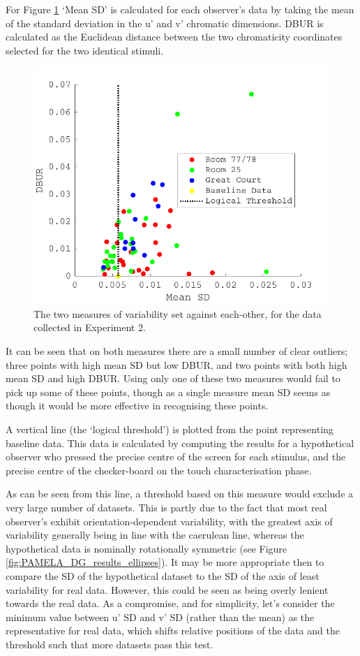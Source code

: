 For Figure \ref{fig:excl1} `Mean SD' is calculated for each observer's data by taking the mean of the standard deviation in the u' and v' chromatic dimensions. \gls{DBUR} is calculated as the Euclidean distance between the two chromaticity coordinates selected for the two identical stimuli.

\begin{figure}[hbtp] 
\includegraphics[max width=\textwidth]{figs/tablet/excl1.pdf} 
\caption{The two measures of variability set against each-other, for the data collected in Experiment 2.}
\label{fig:excl1}
\end{figure}

It can be seen that on both measures there are a small number of clear outliers; three points with high mean SD but low \gls{DBUR}, and two points with both high mean SD and high \gls{DBUR}. Using only one of these two measures would fail to pick up some of these points, though as a single measure mean SD seems as though it would be more effective in recognising these points.

A vertical line (the `logical threshold') is plotted from the point representing baseline data. This data is calculated by computing the results for a hypothetical observer who pressed the precise centre of the screen for each stimulus, and the precise centre of the checker-board on the touch characterisation phase. 

As can be seen from this line, a threshold based on this measure would exclude a very large number of datasets. This is partly due to the fact that most real observer's exhibit orientation-dependent variability, with the greatest axis of variability generally being in line with the caerulean line, whereas the hypothetical data is nominally rotationally symmetric (see Figure \ref{fig:PAMELA_DG_results_ellipses}). It may be more appropriate then to compare the SD of the hypothetical dataset to the SD of the axis of least variability for real data. However, this could be seen as being overly lenient towards the real data. As a compromise, and for simplicity, let's consider the minimum value between u' SD and v' SD (rather than the mean) as the representative for real data, which shifts relative positions of the data and the threshold such that more datasets pass this test. 

